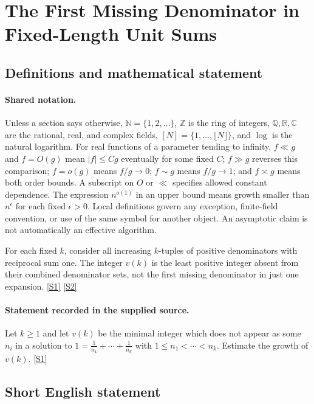 \documentclass[11pt,a4paper]{article}
\newcommand{\N}{\mathbb{N}}
\newcommand{\Z}{\mathbb{Z}}
\newcommand{\Q}{\mathbb{Q}}
\newcommand{\R}{\mathbb{R}}
\newcommand{\C}{\mathbb{C}}
\newcommand{\sref}[2]{\hyperlink{source:#1:#2}{[S#2]}}
\begin{document}
\section{The First Missing Denominator in Fixed-Length Unit Sums}\label{statement}


\subsection{Definitions and mathematical statement}

\paragraph{Shared notation.}Unless a section says otherwise, $\N=\{1,2,\ldots\}$,
$\Z$ is the ring of integers, $\Q,\R,\C$ are the rational, real, and complex
fields, $[N]=\{1,\ldots,\lfloor N\rfloor\}$, and $\log$ is the natural
logarithm. For real functions of a parameter tending to infinity,
$f\ll g$ and $f=O(g)$ mean $|f|\leq Cg$ eventually for some fixed $C$;
$f\gg g$ reverses this comparison; $f=o(g)$ means $f/g\to0$;
$f\sim g$ means $f/g\to1$; and $f\asymp g$ means both order bounds.
A subscript on $O$ or $\ll$ specifies allowed constant dependence.
The expression $n^{o(1)}$ in an upper bound means growth smaller than
$n^\epsilon$ for each fixed $\epsilon>0$. Local definitions govern any
exception, finite-field convention, or use of the same symbol for another
object. An asymptotic claim is not automatically an effective algorithm.



For each fixed $k$, consider all increasing $k$-tuples of positive denominators with reciprocal sum one. The integer $v(k)$ is the least positive integer absent from their combined denominator sets, not the first missing denominator in just one expansion. \sref{statement}{1} \sref{statement}{2}

\paragraph{Statement recorded in the supplied source.}
Let $k\geq 1$ and let $v(k)$ be the minimal integer which does not appear as some $n_i$ in a solution to $ 1=\frac{1}{n_1}+\cdots+\frac{1}{n_k} $ with $1\leq n_1<\cdots <n_k$. Estimate the growth of $v(k)$. \sref{statement}{1}

\subsection{Short English statement}
\end{document}
